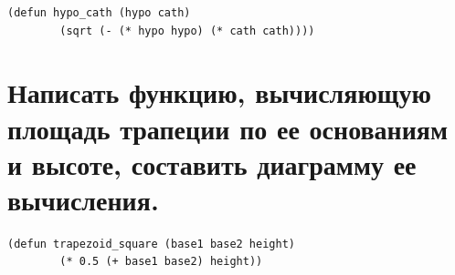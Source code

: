\begin{lstlisting}[caption=Дополнительное задание 1.]
	(defun hypo_cath (hypo cath) 
		(sqrt (- (* hypo hypo) (* cath cath))))
\end{lstlisting}

\begin{figure}[H]
\end{figure}

\section{Написать функцию, вычисляющую площадь трапеции по ее основаниям и 	высоте, составить диаграмму ее вычисления.}

\begin{lstlisting}[caption=Дополнительное задание 2.]
	(defun trapezoid_square (base1 base2 height) 
		(* 0.5 (+ base1 base2) height))
\end{lstlisting}

